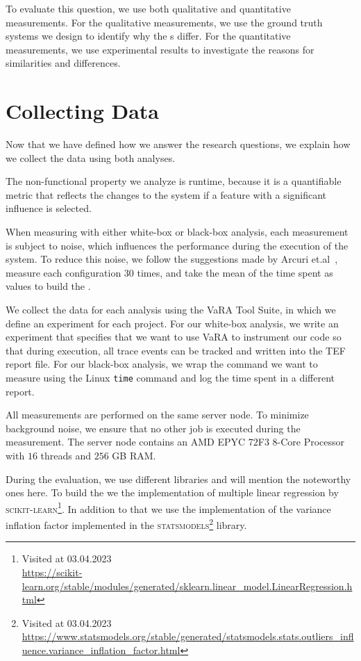To evaluate this question, we use both qualitative and quantitative measurements. 
For the qualitative measurements, we use the ground truth systems we design to identify why the {\perfInfluenceModel}s differ. 
For the quantitative measurements, we use experimental results to investigate the reasons for similarities and differences.

\section{Collecting Data}\label{ch:collect-data}
Now that we have defined how we answer the research questions, we explain how we collect the data using both analyses.

The non-functional property we analyze is runtime, because it is a quantifiable metric
that reflects the changes to the system if a feature with a significant influence is selected.

When measuring with either white-box or black-box analysis, 
each measurement is subject to noise, which influences the performance during the execution of the system. 
To reduce this noise, we follow the suggestions made by Arcuri et.al~\cite{SampleSize}, 
measure each configuration 30 times, and take the mean of the time spent as values to build the {\perfInfluenceModel}.

We collect the data for each analysis using the VaRA Tool Suite, in which we define an experiment for each project. 
For our white-box analysis, we write an experiment that specifies that we want to use VaRA to instrument our code so that during execution, 
all trace events can be tracked and written into the TEF report file. For our black-box analysis, 
we wrap the command we want to measure using the Linux \texttt{time} command and log the time spent in a different report. 

All measurements are performed on the same server node. To minimize background noise, we ensure that no other job is executed during the measurement. 
The server node contains an AMD EPYC $72$F$3$  $8$-Core Processor with $16$ threads and $256$ GB RAM.

During the evaluation, we use different libraries and will mention the noteworthy ones here.
To build the {\perfInfluenceModel} we the implementation of multiple linear regression by \textsc{scikit-learn}\footnote{Visited at 03.04.2023\\ \url{https://scikit-learn.org/stable/modules/generated/sklearn.linear_model.LinearRegression.html}}.
In addition to that we use the implementation of the variance inflation factor implemented in the \textsc{statsmodels}\footnote{Visited at 03.04.2023\\ \url{https://www.statsmodels.org/stable/generated/statsmodels.stats.outliers_influence.variance_inflation_factor.html}} library.

